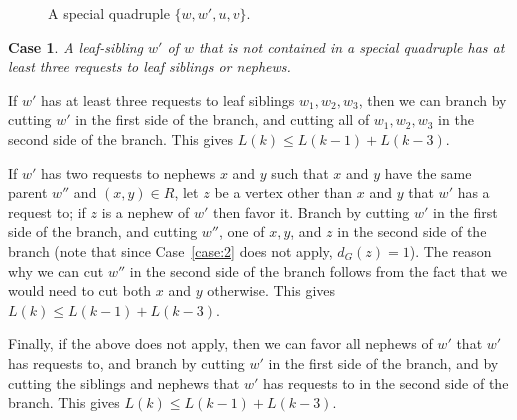 \documentclass[11pt]{article}
\newcommand{\important}[2] {\node[name=#1, minimum size=8mm] {#2};}
\newcommand{\leaf}[2] {\node[rectangle,name=#1, minimum size=5mm] {#2};}
\newtheorem{case}[theorem]{Case}
\begin{document}
\begin{figure}
\begin{center}
\end{center}

\caption{A special quadruple $\{w, w', u, v\}$.} \label{fig:quadruple}
\end{figure}


\begin{case}\label{case:70}
A leaf-sibling $w'$ of $w$ that is not contained in a special quadruple has at least three requests to leaf siblings or nephews.
\end{case}

If $w'$ has at least three requests to leaf siblings $w_1, w_2, w_3$, then we can branch by cutting $w'$ in the first side of the branch, and cutting all of $w_1, w_2, w_3$ in the second side of the branch. This gives $L(k) \leq L(k-1) + L(k-3)$.

If $w'$ has two requests to nephews $x$ and $y$ such that $x$ and $y$ have the same parent $w''$ and $(x, y) \in R$, let $z$ be a vertex other than $x$ and $y$ that $w'$ has a request to; if $z$ is a nephew of $w'$ then favor it. Branch by cutting $w'$ in the first side of the branch, and cutting $w''$, one of $x, y$, and $z$ in the second side of the branch (note that since Case~\ref{case:2} does not apply, $d_G(z) =1$). The reason why we can cut $w''$ in the second side of the branch follows from the fact that we would need to cut both $x$ and $y$ otherwise. This gives $L(k) \leq L(k-1) + L(k-3)$.

Finally, if the above does not apply, then we can favor all nephews of $w'$ that $w'$ has requests to, and branch by cutting $w'$ in the first side of the branch, and by cutting the siblings and nephews that $w'$ has requests to in the second side of the branch. This gives $L(k) \leq L(k-1) + L(k-3)$.
\end{document}
